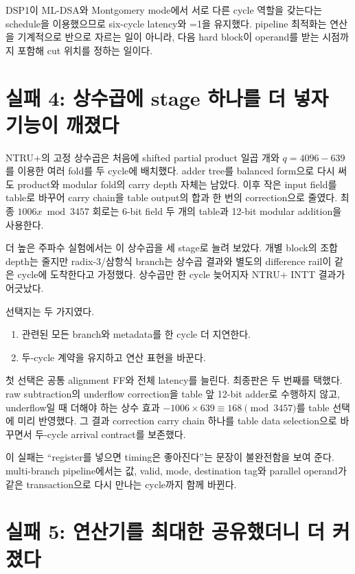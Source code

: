 DSP1이 ML-DSA와 Montgomery mode에서 서로 다른 cycle 역할을 갖는다는 schedule을
이용했으므로 six-cycle latency와 \ii=1을 유지했다. pipeline 최적화는 연산을
기계적으로 반으로 자르는 일이 아니라, 다음 hard block이 operand를 받는
시점까지 포함해 cut 위치를 정하는 일이다.

\section{실패 4: 상수곱에 stage 하나를 더 넣자 기능이 깨졌다}

NTRU+의 고정 상수곱은 처음에 shifted partial product 일곱 개와
$q=4096-639$를 이용한 여러 fold를 두 cycle에 배치했다. adder tree를
balanced form으로 다시 써도 product와 modular fold의 carry depth 자체는
남았다. 이후 작은 input field를 table로 바꾸어 carry chain을 table output의
합과 한 번의 correction으로 줄였다. 최종 $1006x\bmod3457$ 회로는
6-bit field 두 개의 table과 12-bit modular addition을 사용한다.

더 높은 주파수 실험에서는 이 상수곱을 세 stage로 늘려 보았다. 개별 block의
조합 depth는 줄지만 radix-3/삼항식 branch는 상수곱 결과와 별도의 difference
rail이 같은 cycle에 도착한다고 가정했다. 상수곱만 한 cycle 늦어지자 NTRU+
INTT 결과가 어긋났다.

선택지는 두 가지였다.

\begin{enumerate}
  \item 관련된 모든 branch와 metadata를 한 cycle 더 지연한다.
  \item 두-cycle 계약을 유지하고 연산 표현을 바꾼다.
\end{enumerate}

첫 선택은 공통 alignment FF와 전체 latency를 늘린다. 최종판은 두 번째를
택했다. raw subtraction의 underflow correction을 table 앞 12-bit adder로
수행하지 않고, underflow일 때 더해야 하는 상수 효과
$-1006\times639\equiv168\pmod{3457}$를 table 선택에 미리 반영했다.
그 결과 correction carry chain 하나를 table data selection으로 바꾸면서
두-cycle arrival contract를 보존했다.

이 실패는 “register를 넣으면 timing은 좋아진다”는 문장이 불완전함을
보여 준다. multi-branch pipeline에서는 값, valid, mode, destination tag와
parallel operand가 같은 transaction으로 다시 만나는 cycle까지 함께 바뀐다.

\section{실패 5: 연산기를 최대한 공유했더니 더 커졌다}

